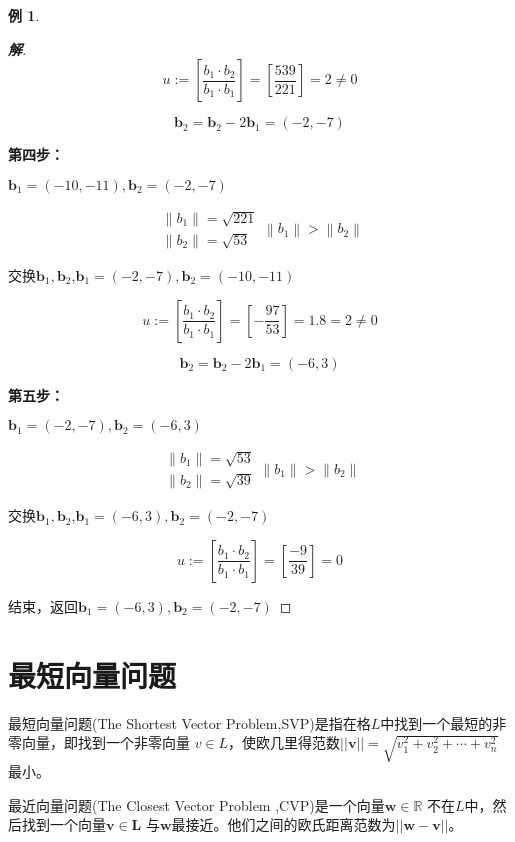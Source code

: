 \documentclass{article}
\theoremstyle{definition}
\newtheorem{example}{\indent 例}
\newenvironment{solution}{\begin{proof}[\indent\bf 解]}{\end{proof}}
\begin{document}
\begin{example}
\begin{solution}
$$u:=\left[\frac{b_{1} \cdot b_{2}}{b_{1} \cdot b_{1}}\right] = \left[\frac{539}{221}\right] = 2 \ne 0$$

$$
\mathbf{b}_{2}=\mathbf{b}_{2} - 2\mathbf{b}_{1} = (-2,-7)
$$

\textbf{第四步：}

$\mathbf{b}_{1} = (-10,-11), \mathbf{b}_{2} =(-2,-7)$

$$
\begin{array}{l}
\left\|b_{1}\right\|= \sqrt{221}\\
\left\|b_{2}\right\|= \sqrt{53}
\end{array} 
\left\|b_{1}\right\|>\left\|b_{2}\right\|
$$

交换$\mathbf{b}_{1},\mathbf{b}_{2}$,$\mathbf{b}_{1} =  (-2,-7), \mathbf{b}_{2} = (-10,-11)$

$$u:=\left[\frac{b_{1} \cdot b_{2}}{b_{1} \cdot b_{1}}\right] = \left[-\frac{97}{53}\right] = 1.8 = 2 \ne 0$$

$$
\mathbf{b}_{2}=\mathbf{b}_{2} - 2\mathbf{b}_{1} = (-6,3)
$$

\textbf{第五步：}

$\mathbf{b}_{1} = (-2,-7), \mathbf{b}_{2} =(-6,3)$

$$
\begin{array}{l}
\left\|b_{1}\right\|= \sqrt{53}\\
\left\|b_{2}\right\|= \sqrt{39}
\end{array} 
\left\|b_{1}\right\|>\left\|b_{2}\right\|
$$

交换$\mathbf{b}_{1},\mathbf{b}_{2}$,$\mathbf{b}_{1} =  (-6,3), \mathbf{b}_{2} = (-2,-7)$

$$u:=\left[\frac{b_{1} \cdot b_{2}}{b_{1} \cdot b_{1}}\right] = \left[\frac{-9}{39}\right]  =  0$$


结束，返回$\mathbf{b}_{1} =  (-6,3), \mathbf{b}_{2} = (-2,-7)$


\end{solution}
\end{example}



\section{最短向量问题}
最短向量问题(The Shortest Vector Problem,SVP)是指在格$L$中找到一个最短的非零向量，即找到一个非零向量 $v \in L$，使欧几里得范数$||\mathbf{v}|| = \sqrt{v_1^2 + v_2^2 + \cdots + v_n^2}$最小。

最近向量问题(The Closest Vector Problem ,CVP)是一个向量$\mathbf{w \in \mathbb{R}}$ 不在$L$中，然后找到一个向量$\mathbf{v \in L}$ 与$\mathbf{w}$最接近。他们之间的欧氏距离范数为$||\mathbf{w-v}||$。
\end{document}
